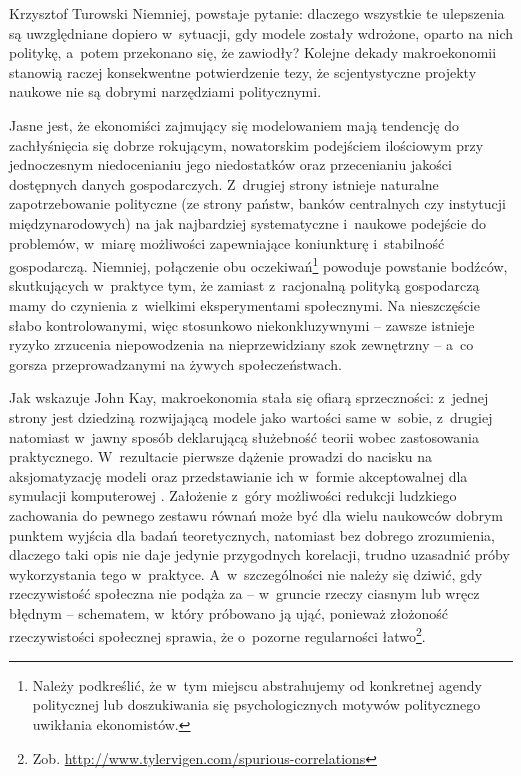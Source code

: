 \begin{artplenv}{Krzysztof Turowski}
Niemniej, powstaje pytanie: dlaczego wszystkie te ulepszenia są uwzględniane dopiero w~sytuacji, gdy modele zostały
wdrożone, oparto na nich politykę, a~potem przekonano się, że zawiodły? Kolejne dekady makroekonomii stanowią raczej
konsekwentne potwierdzenie tezy, że scjentystyczne projekty naukowe nie są dobrymi narzędziami politycznymi.

Jasne jest, że ekonomiści zajmujący się modelowaniem mają tendencję do zachłyśnięcia się dobrze rokującym, nowatorskim
podejściem ilościowym przy jednoczesnym niedocenianiu jego niedostatków oraz przecenianiu jakości dostępnych danych
gospodarczych. Z~drugiej strony istnieje naturalne zapotrzebowanie polityczne (ze strony państw, banków centralnych czy
instytucji międzynarodowych) na jak najbardziej systematyczne i~naukowe podejście do problemów, w~miarę możliwości
zapewniające koniunkturę i~stabilność gospodarczą. Niemniej, połączenie obu oczekiwań\footnote{Należy podkreślić,
że w~tym miejscu abstrahujemy od konkretnej agendy politycznej lub doszukiwania się psychologicznych motywów politycznego
uwikłania ekonomistów.} powoduje powstanie bodźców, skutkujących w~praktyce tym, że zamiast z~racjonalną polityką
gospodarczą mamy do czynienia z~wielkimi eksperymentami społecznymi. Na nieszczęście słabo kontrolowanymi, więc
stosunkowo niekonkluzywnymi  --  zawsze istnieje ryzyko zrzucenia niepowodzenia na nieprzewidziany szok
zewnętrzny  --  a~co gorsza przeprowadzanymi na żywych społeczeństwach.

Jak wskazuje John Kay, makroekonomia stała się ofiarą sprzeczności: z~jednej strony jest dziedziną rozwijającą modele
jako wartości same w~sobie, z~drugiej natomiast w~jawny sposób deklarującą służebność teorii wobec zastosowania
praktycznego. W~rezultacie pierwsze dążenie prowadzi do nacisku na aksjomatyzację modeli oraz przedstawianie
ich w~formie akceptowalnej dla symulacji komputerowej
\parencite{kay_map_2012}.
Założenie z~góry możliwości
redukcji ludzkiego zachowania do pewnego zestawu równań może być dla wielu naukowców dobrym punktem wyjścia dla badań
teoretycznych, natomiast bez dobrego zrozumienia, dlaczego taki opis nie daje jedynie przygodnych korelacji, trudno
uzasadnić próby wykorzystania tego w~praktyce. A~w~szczególności nie należy się dziwić, gdy rzeczywistość społeczna nie
podąża za  --  w~gruncie rzeczy ciasnym lub wręcz błędnym  --  schematem, w~który próbowano ją ująć,
ponieważ złożoność rzeczywistości społecznej sprawia, że o~pozorne regularności łatwo\footnote{Zob.
\url{http://www.tylervigen.com/spurious-correlations}}.


\end{artplenv}
